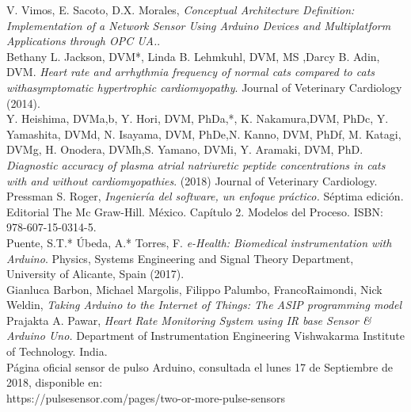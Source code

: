 \documentclass[letterpaper, 10 pt, conference]{ieeeconf}  %
\begin{document}
\begin{thebibliography}{99}

 V. Vimos, E. Sacoto, D.X. Morales, \textit{Conceptual Architecture Definition: Implementation of a Network Sensor Using Arduino Devices and Multiplatform Applications through OPC UA.}.\\

 Bethany L. Jackson, DVM*, Linda B. Lehmkuhl, DVM, MS ,Darcy B. Adin, DVM. \textit{Heart rate and arrhythmia frequency of normal cats compared to cats withasymptomatic hypertrophic cardiomyopathy}. Journal of Veterinary Cardiology (2014). \\ 

 Y. Heishima, DVMa,b, Y. Hori, DVM, PhDa,*, K. Nakamura,DVM, PhDc, Y. Yamashita, DVMd, N. Isayama, DVM, PhDe,N. Kanno, DVM, PhDf, M. Katagi, DVMg, H. Onodera, DVMh,S. Yamano, DVMi, Y. Aramaki, DVM, PhD. \textit{Diagnostic accuracy of plasma atrial natriuretic peptide concentrations in cats with and without cardiomyopathies}.  (2018) Journal of Veterinary Cardiology. \\

 Pressman S. Roger, \textit{Ingenier\'ia del software, un enfoque pr\'actico.} S\'eptima edici\'on. Editorial The Mc Graw-Hill. M\'exico. Cap\'itulo 2. Modelos del Proceso. ISBN: 978-607-15-0314-5.\\

 Puente, S.T.* Úbeda, A.* Torres, F. \textit{e-Health: Biomedical instrumentation with Arduino}. Physics, Systems Engineering and Signal Theory Department, University of Alicante, Spain (2017).\\

 Gianluca Barbon, Michael Margolis, Filippo Palumbo, FrancoRaimondi, Nick Weldin, \textit{Taking Arduino to the Internet of Things: The ASIP programming model}\\

 Prajakta A. Pawar, \textit{Heart Rate Monitoring System using IR base Sensor \& Arduino Uno.} Department of Instrumentation Engineering Vishwakarma  Institute of  Technology. India.\\

 P\'agina oficial sensor de pulso Arduino, consultada el lunes 17 de Septiembre de 2018, disponible en:\\ https://pulsesensor.com/pages/two-or-more-pulse-sensors


\end{thebibliography}
\end{document}
